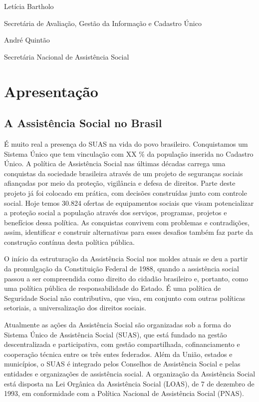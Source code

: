 \documentclass[
  letterpaper,
  DIV=11,
  numbers=noendperiod]{scrreprt}
\begin{document}
Letícia Bartholo

Secretária de Avaliação, Gestão da Informação e Cadastro Único

André Quintão

Secretária Nacional de Assistência Social


\chapter*{Apresentação}\label{apresentauxe7uxe3o}


\section*{A Assistência Social no
Brasil}\label{a-assistuxeancia-social-no-brasil}


É muito real a presença do SUAS na vida do povo brasileiro. Conquistamos
um Sistema Único que tem vinculação com XX \% da população inserida no
Cadastro Único. A política de Assistência Social nas últimas décadas
carrega uma conquistas da sociedade brasileira através de um projeto de
seguranças sociais afiançadas por meio da proteção, vigilância e defesa
de direitos. Parte deste projeto já foi colocado em prática, com
decisões construídas junto com controle social. Hoje temos 30.824
ofertas de equipamentos sociais que visam potencializar a proteção
social a população através dos serviços, programas, projetos e
benefícios dessa política. As conquistas convivem com problemas e
contradições, assim, identificar e construir alternativas para esses
desafios também faz parte da construção contínua desta política pública.

O início da estruturação da Assistência Social nos moldes atuais se deu
a partir da promulgação da Constituição Federal de 1988, quando a
assistência social passou a ser compreendida como direito do cidadão
brasileiro e, portanto, como uma política pública de responsabilidade do
Estado. É uma política de Seguridade Social não contributiva, que visa,
em conjunto com outras políticas setoriais, a universalização dos
direitos sociais.

Atualmente as ações da Assistência Social são organizadas sob a forma do
Sistema Único de Assistência Social (SUAS), que está fundado na gestão
descentralizada e participativa, com gestão compartilhada,
cofinanciamento e cooperação técnica entre os três entes federados. Além
da União, estados e municípios, o SUAS é integrado pelos Conselhos de
Assistência Social e pelas entidades e organizações de assistência
social. A organização da Assistência Social está disposta na Lei
Orgânica da Assistência Social (LOAS), de 7 de dezembro de 1993, em
conformidade com a Política Nacional de Assistência Social (PNAS).
\end{document}
